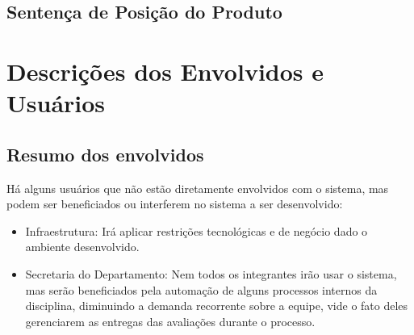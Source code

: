 \subsection{Sentença de Posição do Produto}

\begin{table}[!htb]
    \centering
    \caption{Sentença básica de posição do produto}
    \label{sentenca-posicao}
\end{table}


\section{Descrições dos Envolvidos e Usuários}
\subsection{Resumo dos envolvidos}

Há alguns usuários que não estão diretamente envolvidos com o sistema, mas podem ser beneficiados ou interferem no sistema a ser desenvolvido:

\begin{itemize}
    \item Infraestrutura: Irá aplicar restrições tecnológicas e de negócio dado o ambiente desenvolvido.
    \item Secretaria do Departamento: Nem todos os integrantes irão usar o sistema, mas serão beneficiados pela automação de alguns processos internos da disciplina, diminuindo a demanda recorrente sobre a equipe, vide o fato deles gerenciarem as entregas das avaliações durante o processo.
\end{itemize}

